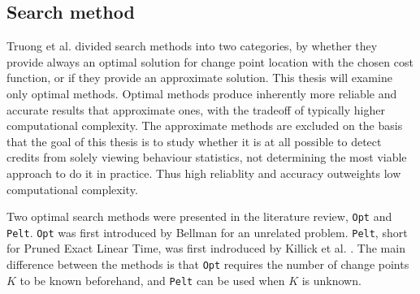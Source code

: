 \subsection{Search method} \label{subsec:searchmethod}

Truong et al. \cite{truongSelectiveReviewOffline2020} divided search methods into two categories, by whether they provide always an optimal solution for change point location with the chosen cost function, or if they provide an approximate solution. This thesis will examine only optimal methods. Optimal methods produce inherently more reliable and accurate results that approximate ones, with the tradeoff of typically higher computational complexity. The approximate methods are excluded on the basis that the goal of this thesis is to study whether it is at all possible to detect credits from solely viewing behaviour statistics, not determining the most viable approach to do it in practice. Thus high reliablity and accuracy outweights low computational complexity.

Two optimal search methods were presented in the literature review, \texttt{Opt} and \texttt{Pelt}. \texttt{Opt} was first introduced by Bellman \cite{bellmanRoutingProblem1958} for an unrelated problem. \texttt{Pelt}, short for Pruned Exact Linear Time, was first indroduced by Killick et al. \cite{killickOptimalDetectionChangepoints2012}. The main difference between the methods is that \texttt{Opt} requires the number of change points $K$ to be known beforehand, and \texttt{Pelt} can be used when $K$ is unknown. 

